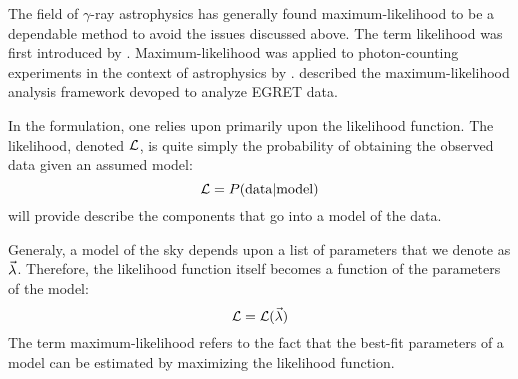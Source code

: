 
The field of $\gamma$-ray astrophysics has generally found
maximum-likelihood to be a dependable method to avoid the issues
discussed above.  The term likelihood was first introduced by
\cite{fisher_1925_statistical-methods}.  Maximum-likelihood was applied
to photon-counting experiments in the context of astrophysics by
\cite{cash_1979_parameter-estimation}. \cite{mattox_1996_likelihood-analysis}
described the maximum-likelihood analysis framework devoped to analyze
EGRET data.

In the formulation, one relies upon primarily upon the likelihood
function.  The likelihood, denoted $\mathcal{L}$, is quite simply the
probability of obtaining the observed data given an assumed model:
\begin{equation}
  \mathcal{L} = P(\text{data}|\text{model})
\end{equation}
 will provide describe the
components that go into a model of the data.

Generaly, a model of the sky depends upon a list
of parameters that we denote as $\vec\lambda$.
Therefore, the likelihood function itself becomes
a function of the parameters of the model:
\begin{equation}
  \mathcal{L} = \mathcal{L}(\vec\lambda)
\end{equation}
The term maximum-likelihood refers to the fact that
the best-fit parameters of a model can be estimated
by maximizing the likelihood function.


